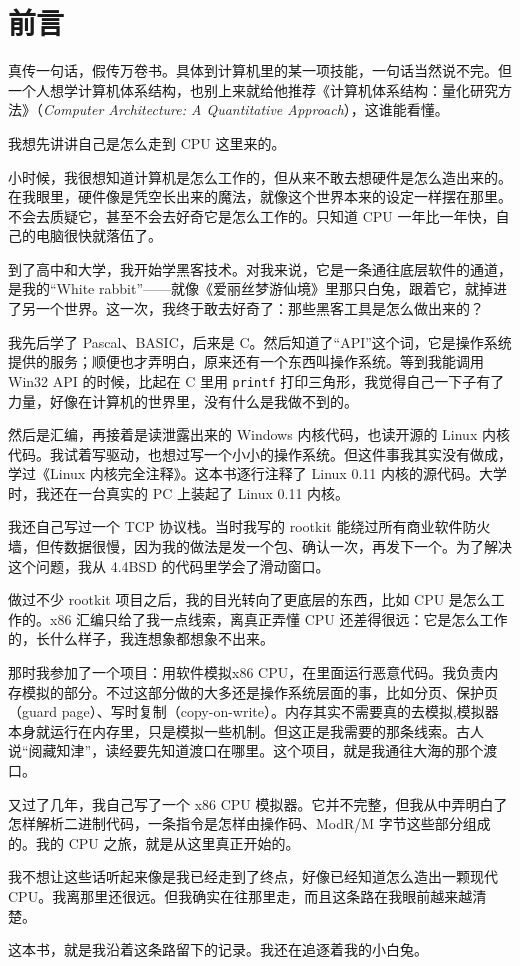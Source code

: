\chapter{前言}

真传一句话，假传万卷书。具体到计算机里的某一项技能，一句话当然说不完。但一个人想学计算机体系结构，也别上来就给他推荐《计算机体系结构：量化研究方法》（\emph{Computer Architecture: A Quantitative Approach}），这谁能看懂。

我想先讲讲自己是怎么走到 CPU 这里来的。

小时候，我很想知道计算机是怎么工作的，但从来不敢去想硬件是怎么造出来的。在我眼里，硬件像是凭空长出来的魔法，就像这个世界本来的设定一样摆在那里。不会去质疑它，甚至不会去好奇它是怎么工作的。只知道 CPU 一年比一年快，自己的电脑很快就落伍了。

到了高中和大学，我开始学黑客技术。对我来说，它是一条通往底层软件的通道，是我的“White rabbit”——就像《爱丽丝梦游仙境》里那只白兔，跟着它，就掉进了另一个世界。这一次，我终于敢去好奇了：那些黑客工具是怎么做出来的？

我先后学了 Pascal、BASIC，后来是 C。然后知道了“API”这个词，它是操作系统提供的服务；顺便也才弄明白，原来还有一个东西叫操作系统。等到我能调用 Win32 API 的时候，比起在 C 里用 \texttt{printf} 打印三角形，我觉得自己一下子有了力量，好像在计算机的世界里，没有什么是我做不到的。

然后是汇编，再接着是读泄露出来的 Windows 内核代码，也读开源的 Linux 内核代码。我试着写驱动，也想过写一个小小的操作系统。但这件事我其实没有做成，学过《Linux 内核完全注释》。这本书逐行注释了 Linux 0.11 内核的源代码。大学时，我还在一台真实的 PC 上装起了 Linux 0.11 内核。

我还自己写过一个 TCP 协议栈。当时我写的 rootkit 能绕过所有商业软件防火墙，但传数据很慢，因为我的做法是发一个包、确认一次，再发下一个。为了解决这个问题，我从 4.4BSD 的代码里学会了滑动窗口。

做过不少 rootkit 项目之后，我的目光转向了更底层的东西，比如 CPU 是怎么工作的。x86 汇编只给了我一点线索，离真正弄懂 CPU 还差得很远：它是怎么工作的，长什么样子，我连想象都想象不出来。

那时我参加了一个项目：用软件模拟x86 CPU，在里面运行恶意代码。我负责内存模拟的部分。不过这部分做的大多还是操作系统层面的事，比如分页、保护页（guard page）、写时复制（copy-on-write）。内存其实不需要真的去模拟,模拟器本身就运行在内存里，只是模拟一些机制。但这正是我需要的那条线索。古人说“阅藏知津”，读经要先知道渡口在哪里。这个项目，就是我通往大海的那个渡口。

又过了几年，我自己写了一个 x86 CPU 模拟器。它并不完整，但我从中弄明白了怎样解析二进制代码，一条指令是怎样由操作码、ModR/M 字节这些部分组成的。我的 CPU 之旅，就是从这里真正开始的。

我不想让这些话听起来像是我已经走到了终点，好像已经知道怎么造出一颗现代 CPU。我离那里还很远。但我确实在往那里走，而且这条路在我眼前越来越清楚。

这本书，就是我沿着这条路留下的记录。我还在追逐着我的小白兔。
